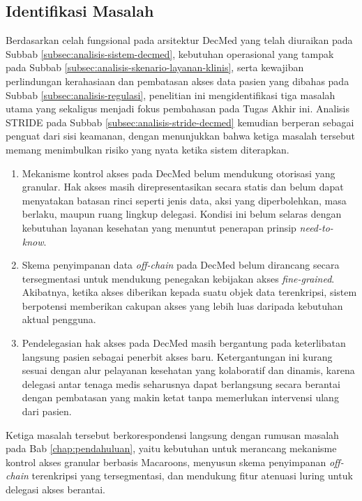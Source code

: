 \subsection{Identifikasi Masalah}
\label{subsec:identifikasi-masalah}
Berdasarkan celah fungsional pada arsitektur DecMed yang telah diuraikan pada Subbab \ref{subsec:analisis-sistem-decmed}, kebutuhan operasional yang tampak pada Subbab \ref{subsec:analisis-skenario-layanan-klinis}, serta kewajiban perlindungan kerahasiaan dan pembatasan akses data pasien yang dibahas pada Subbab \ref{subsec:analisis-regulasi}, penelitian ini mengidentifikasi tiga masalah utama yang sekaligus menjadi fokus pembahasan pada Tugas Akhir ini. Analisis STRIDE pada Subbab \ref{subsec:analisis-stride-decmed} kemudian berperan sebagai penguat dari sisi keamanan, dengan menunjukkan bahwa ketiga masalah tersebut memang menimbulkan risiko yang nyata ketika sistem diterapkan.

\begin{enumerate}[leftmargin=*]
	\item Mekanisme kontrol akses pada DecMed belum mendukung otorisasi yang granular. Hak akses masih direpresentasikan secara statis dan belum dapat menyatakan batasan rinci seperti jenis data, aksi yang diperbolehkan, masa berlaku, maupun ruang lingkup delegasi. Kondisi ini belum selaras dengan kebutuhan layanan kesehatan yang menuntut penerapan prinsip \textit{need-to-know}.
	\item Skema penyimpanan data \textit{off-chain} pada DecMed belum dirancang secara tersegmentasi untuk mendukung penegakan kebijakan akses \textit{fine-grained}. Akibatnya, ketika akses diberikan kepada suatu objek data terenkripsi, sistem berpotensi memberikan cakupan akses yang lebih luas daripada kebutuhan aktual pengguna.
	\item Pendelegasian hak akses pada DecMed masih bergantung pada keterlibatan langsung pasien sebagai penerbit akses baru. Ketergantungan ini kurang sesuai dengan alur pelayanan kesehatan yang kolaboratif dan dinamis, karena delegasi antar tenaga medis seharusnya dapat berlangsung secara berantai dengan pembatasan yang makin ketat tanpa memerlukan intervensi ulang dari pasien.
\end{enumerate}

Ketiga masalah tersebut berkorespondensi langsung dengan rumusan masalah pada Bab \ref{chap:pendahuluan}, yaitu kebutuhan untuk merancang mekanisme kontrol akses granular berbasis Macaroons, menyusun skema penyimpanan \textit{off-chain} terenkripsi yang tersegmentasi, dan mendukung fitur atenuasi luring untuk delegasi akses berantai.
